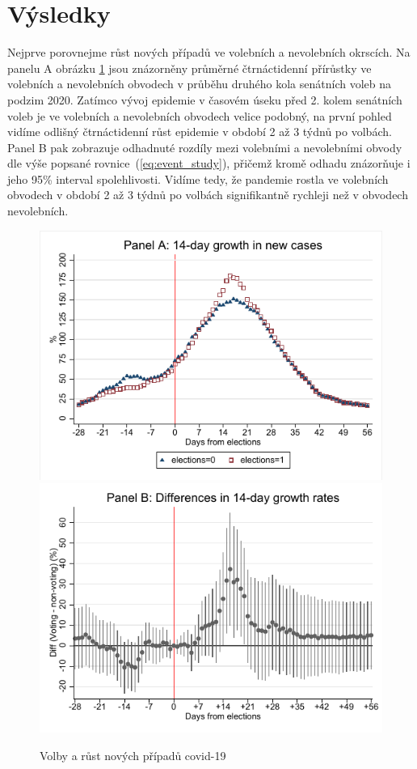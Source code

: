 \section*{Výsledky}
Nejprve porovnejme růst nových případů ve volebních a nevolebních okrscích. Na panelu A obrázku \ref{fig:Covid_growth14}  jsou znázorněny průměrné čtrnáctidenní přírůstky ve volebních a nevolebních obvodech v průběhu druhého kola senátních voleb na podzim 2020. Zatímco vývoj epidemie v časovém úseku před 2. kolem senátních voleb
je ve volebních a nevolebních obvodech velice podobný, na první pohled vidíme odlišný čtrnáctidenní růst epidemie v období 2 až 3 týdnů po volbách. Panel B pak zobrazuje odhadnuté rozdíly mezi volebními a nevolebními obvody dle výše popsané rovnice~(\ref{eq:event_study}),
přičemž kromě odhadu znázorňuje i jeho 95\% interval spolehlivosti. Vidíme tedy, že pandemie rostla ve volebních obvodech v období 2 až 3 týdnů po volbách signifikantně rychleji než v obvodech nevolebních. 

\begin{figure}     
     \begin{center}
    \includegraphics[scale=0.58]{binscatter_new_cases14.pdf} 
    \includegraphics[scale=0.58]{Covid+_growth_rate14.pdf} 
	\caption{Volby a růst nových případů covid-19}
    \label{fig:Covid_growth14}
	\end{center}
\end{figure}

